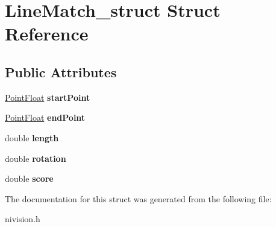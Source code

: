 \hypertarget{structLineMatch__struct}{
\section{LineMatch\_\-struct Struct Reference}
\label{structLineMatch__struct}
}
\subsection*{Public Attributes}
\begin{DoxyCompactItemize}
\item 
\hypertarget{structLineMatch__struct_af1d5f245be68486c0a2bc25c46dc5e8d}{
\hyperlink{structPointFloat__struct}{PointFloat} {\bfseries startPoint}}
\label{structLineMatch__struct_af1d5f245be68486c0a2bc25c46dc5e8d}

\item 
\hypertarget{structLineMatch__struct_a95a758195d2469f131ad0d7dea84bff1}{
\hyperlink{structPointFloat__struct}{PointFloat} {\bfseries endPoint}}
\label{structLineMatch__struct_a95a758195d2469f131ad0d7dea84bff1}

\item 
\hypertarget{structLineMatch__struct_a7a2c480ebab2948411880b3bfd6f82fe}{
double {\bfseries length}}
\label{structLineMatch__struct_a7a2c480ebab2948411880b3bfd6f82fe}

\item 
\hypertarget{structLineMatch__struct_a926da5ef2198fb7e9ff198622872fc02}{
double {\bfseries rotation}}
\label{structLineMatch__struct_a926da5ef2198fb7e9ff198622872fc02}

\item 
\hypertarget{structLineMatch__struct_af67d0d397b2e34b13d9121b6741fd998}{
double {\bfseries score}}
\label{structLineMatch__struct_af67d0d397b2e34b13d9121b6741fd998}

\end{DoxyCompactItemize}


The documentation for this struct was generated from the following file:\begin{DoxyCompactItemize}
\item 
nivision.h\end{DoxyCompactItemize}
